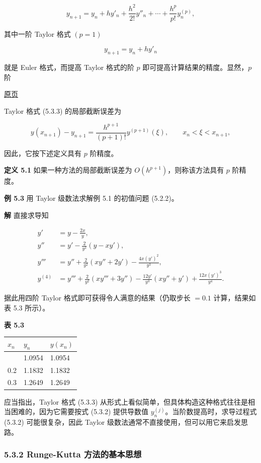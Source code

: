 \documentclass[
  10pt,
  fontset=fandol]{ctexart}
\newcounter{none} %
\begin{document}
\[
y_{n+1}=y_n+hy'_n+\frac{h^2}{2!}y''_n+\cdots+\frac{h^p}{p!}y_n^{(p)},\tag{5.3.3}
\]

其中一阶 Taylor 格式 \((p=1)\)

\[
y_{n+1}=y_n+hy'_n
\]

就是 Euler 格式，而提高 Taylor 格式的阶 \(p\) 即可提高计算结果的精度。显然，\(p\) 阶

\href{../../source-images/pdf-127.jpeg}{原页}

Taylor 格式 (5.3.3) 的局部截断误差为

\[
y(x_{n+1})-y_{n+1}=\frac{h^{p+1}}{(p+1)!}y^{(p+1)}(\xi),\qquad x_n<\xi<x_{n+1},
\]

因此，它按下述定义具有 \(p\) 阶精度。

\textbf{定义 5.1} 如果一种方法的局部截断误差为 \(O(h^{p+1})\)，则称该方法具有 \(p\) 阶精度。

\textbf{例 5.3} 用 Taylor 级数法求解例 5.1 的初值问题 (5.2.2)。

\textbf{解} 直接求导知

\[
\begin{aligned}
y'&=y-\frac{2x}{y},\\
y''&=y'-\frac{2}{y^2}(y-xy'),\\
y'''&=y''+\frac{2}{y^2}(xy''+2y')-\frac{4x(y')^2}{y^3},\\
y^{(4)}&=y'''+\frac{2}{y^2}(xy'''+3y'')-\frac{12y'}{y^3}(xy''+y')+\frac{12x(y')^3}{y^4}.
\end{aligned}
\]

据此用四阶 Taylor 格式即可获得令人满意的结果（仍取步长 \(=0.1\) 计算，结果如表 5.3 所示）。

\textbf{表 5.3}

{\def\LTcaptype{none} %
\begin{longtable}[]{@{}lll@{}}
\toprule\noalign{}
\(x_n\) & \(y_n\) & \(y(x_n)\) \\
\midrule\noalign{}
\endhead
\bottomrule\noalign{}
\endlastfoot
0.1 & 1.0954 & 1.0954 \\
0.2 & 1.1832 & 1.1832 \\
0.3 & 1.2649 & 1.2649 \\
\end{longtable}
}

应当指出，Taylor 格式 (5.3.3) 从形式上看似简单，但具体构造这种格式往往是相当困难的，因为它需要按式 (5.3.2) 提供导数值 \(y_n^{(j)}\)。当阶数提高时，求导过程式 (5.3.2) 可能很复杂，因此 Taylor 级数法通常不直接使用，但可以用它来启发思路。

\subsubsection{5.3.2 Runge-Kutta 方法的基本思想}\label{runge-kutta-ux65b9ux6cd5ux7684ux57faux672cux601dux60f3}
\end{document}
